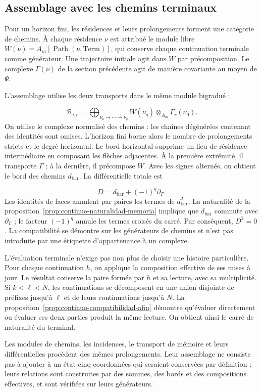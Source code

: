 \subsection{Assemblage avec les chemins terminaux}
Pour un horizon fini, les résidences et leurs prolongements forment une catégorie de chemins. À chaque résidence \(\nu\) est attribué le module libre \(W(\nu)=A_m[\operatorname{Path}(\nu,\mathrm{Term})]\), qui conserve chaque continuation terminale comme générateur. Une trajectoire initiale agit dans \(W\) par précomposition. Le complexe \(\Gamma(\nu)\) de la section précédente agit de manière covariante au moyen de \(\Psi\).

L'assemblage utilise les deux transports dans le même module bigradué :

\[
\mathcal B_{q,r}=
\bigoplus_{\nu_0\to\cdots\to\nu_q}
W(\nu_q)\otimes_{A_m}\Gamma_r(\nu_0).
\]
On utilise le complexe normalisé des chemins : les chaînes dégénérées contenant des identités sont omises. L'horizon fini borne alors le nombre de prolongements stricts et le degré horizontal. Le bord horizontal supprime un lieu de résidence intermédiaire en composant les flèches adjacentes. À la première extrémité, il transporte \(\Gamma\) ; à la dernière, il précompose \(W\). Avec les signes alternés, on obtient le bord des chemins \(d_{\mathrm{bar}}\). La différentielle totale est

\[
D=d_{\mathrm{bar}}+(-1)^q\partial_\Gamma.
\]
Les identités de faces annulent par paires les termes de \(d_{\mathrm{bar}}^2\). La naturalité de la proposition~\ref{prop:continuo-naturalidad-memoria} implique que \(d_{\mathrm{bar}}\) commute avec \(\partial_\Gamma\) ; le facteur \((-1)^q\) annule les termes croisés du carré. Par conséquent, \(D^2=0\). La compatibilité se démontre sur les générateurs de chemins et n'est pas introduite par une étiquette d'appartenance à un complexe.

L'évaluation terminale n'exige pas non plus de choisir une histoire particulière. Pour chaque continuation \(h\), on applique la composition effective de ses mises à jour. Le résultat conserve la paire formée par \(h\) et sa lecture, avec sa multiplicité. Si \(k<\ell<N\), les continuations se décomposent en une union disjointe de préfixes jusqu'à \(\ell\) et de leurs continuations jusqu'à \(N\). La proposition~\ref{prop:continuo-compatibilidad-afin} démontre qu'évaluer directement ou évaluer ces deux parties produit la même lecture. On obtient ainsi le carré de naturalité du terminal.

Les modules de chemins, les incidences, le transport de mémoire et leurs différentielles procèdent des mêmes prolongements. Leur assemblage ne consiste pas à ajouter à un état cinq coordonnées qui seraient conservées par définition : leurs relations sont construites par des sommes, des bords et des compositions effectives, et sont vérifiées sur leurs générateurs.

